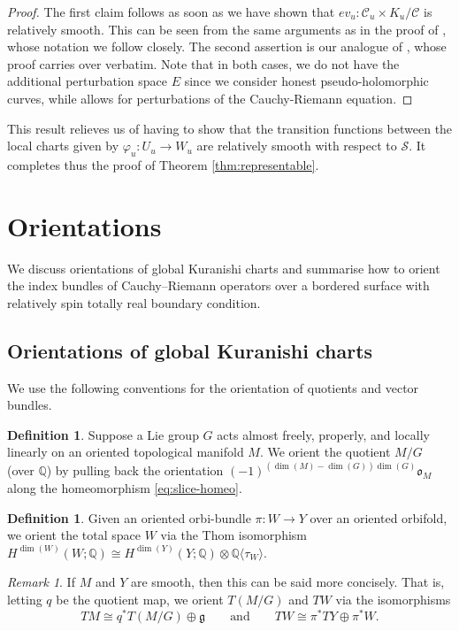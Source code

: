 \documentclass[11pt,psamsfonts, oneside, reqno]{amsart}
\newcommand{\cl}{\colon}
\newcommand{\eva}{ev}
\newcommand{\lspan}[1]{\langle {#1}\rangle}
\newcommand{\bQ}{\mathbb{Q}}
\newcommand{\cC}{\mathcal{C}}
\newcommand{\cS}{\mathcal{S}}
\newcommand{\fg}{\mathfrak{g}}
\newcommand{\fo}{\mathfrak{o}}
\theoremstyle{definition}
\newtheorem{definition}[theorem]{Definition}
\theoremstyle{remark}
\newtheorem{remark}[theorem]{Remark}
\numberwithin{equation}{section}
\begin{document}
\begin{proof} The first claim follows as soon as we have shown that $\eva_u\cl \cC_u\times K_u/\cC$ is relatively smooth. This can be seen from the same arguments as in the proof of \cite[Theorem~4.14]{Swa21}, whose notation we follow closely. The second assertion is our analogue of \cite[Theorem~4.16]{Swa21}, whose proof carries over verbatim. Note that in both cases, we do not have the additional perturbation space $E$ since we consider honest pseudo-holomorphic curves, while \cite{Swa21} allows for perturbations of the Cauchy-Riemann equation.\end{proof}

This result relieves us of having to show that the transition functions between the local charts given by $\varphi_u\cl U_u \to W_u$ are relatively smooth with respect to $\cS$. It completes thus the proof of Theorem \ref{thm:representable}.
\section{Orientations}\label{sec:orientations}
We discuss orientations of global Kuranishi charts and summarise how to orient the index bundles of Cauchy--Riemann operators over a bordered surface with relatively spin totally real boundary condition.


\subsection{Orientations of global Kuranishi charts}\label{subesc:gkc-conventions}
We use the following conventions for the orientation of quotients and vector bundles.

\begin{definition}\label{de:or-quotient} Suppose a Lie group $G$ acts almost freely, properly, and locally linearly on an oriented topological manifold $M$. We orient the quotient $M/G$ (over $\bQ$) by pulling back the orientation $(-1)^{(\dim(M)-\dim(G))\dim(G)}\fo_M$ along the homeomorphism \eqref{eq:slice-homeo}.
\end{definition}

\begin{definition}\label{de:or-vector-bundle} Given an oriented orbi-bundle $\pi \cl W\to Y$ over an oriented orbifold, we orient the total space $W$ via the Thom isomorphism $H^{\dim(W)}(W;\bQ)\cong H^{\dim(Y)}(Y;\bQ)\otimes \bQ\lspan{\tau_W}$. 
\end{definition}

\begin{remark}\label{rem:or-smooth-case} If $M$ and $Y$ are smooth, then this can be said more concisely. That is, letting $q$ be the quotient map, we orient $T(M/G)$ and $TW$ via the isomorphisms 
	$$TM\cong q^*T(M/G)\oplus \fg\qquad \text{and}\qquad TW\cong \pi^*TY\oplus \pi^*W.$$
\end{remark}
\end{document}
